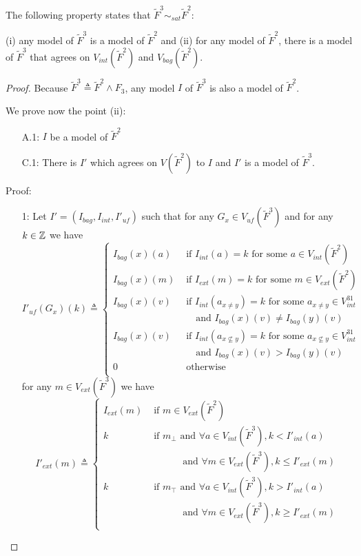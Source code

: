 The following property states that $\tilde{F}^3 \sim_{sat} \tilde{F}^2$:
\begin{myprop}
\label{prop:countabs}
(i) any model of $\tilde{F}^3$ is a model of $\tilde{F}^2$ and
(ii) for any model of $\tilde{F}^2$, there is a model of $\tilde{F}^3$ that agrees on $V_{int}(\tilde{F}^2)$ and $V_{bag}(\tilde{F}^2)$.
\end{myprop}

\begin{proof}

Because $\tilde{F}^3 \triangleq \tilde{F}^2 \land F_{3}$, any model $I$ of $\tilde{F}^3$ is also a model of $\tilde{F}^2$.

We prove now the point (ii):
\begin{enumerate}
\item[A.1:] $I$ be a model of $\tilde{F}^2$
\item[C.1:] There is $I'$ which agrees on $V(\tilde{F}^2)$ to $I$ and $I'$ is a model of $\tilde{F}^3$.
\end{enumerate}
Proof:
\begin{enumerate}
\item[1:] Let $I'=(I_{bag}, I_{int},I'_{\textit{uf}})$ such that for any $G_{x}\in V_{\textit{uf}}(\tilde{F}^3)$ and for any $k \in \mathbb{Z}$ we have
$$
I'_{\textit{uf}}(G_{x})(k) \triangleq \left\{
\begin{array}{ll}
I_{bag}(x)(a) & \mbox{ if }  I_{int}(a) = k \mbox{ for some } a \in V_{int}(\tilde{F}^2) \\
I_{bag}(x)(m) & \mbox{ if }  I_{ext}(m) = k \mbox{ for some } m \in V_{ext}(\tilde{F}^2) \\
I_{bag}(x)(v) & \mbox{ if }  I_{int}(a_{x\neq y}) = k \mbox{ for some }a_{x\neq y} \in V^{31}_{int} \\
& \quad \mbox{ and } I_{bag}(x)(v) \neq I_{bag}(y)(v)\\
I_{bag}(x)(v) & \mbox{ if }  I_{int}(a_{x\nsubseteq y}) = k \mbox{ for some }a_{x\nsubseteq y} \in V^{31}_{int} \\
& \quad \mbox{ and } I_{bag}(x)(v) > I_{bag}(y)(v)\\
0 & \mbox{ otherwise}\\
\end{array}\right.
$$
for any $m\in V_{ext}(\tilde{F}^3)$ we have
$$
I'_{ext}(m) \triangleq \left\{
\begin{array}{ll}
I_{ext}(m) & \mbox{ if } m \in V_{ext}(\tilde{F}^2) \\
k & \mbox{ if } m_{\bot} \mbox{ and } \forall a \in V_{int}(\tilde{F}^3), k<I'_{int}(a) \\
& \quad\quad\quad\mbox{ and } \forall m \in V_{ext}(\tilde{F}^3), k\leq I'_{ext}(m)\\
k & \mbox{ if } m_{\top} \mbox{ and } \forall a \in V_{int}(\tilde{F}^3), k>I'_{int}(a) \\
& \quad\quad\quad\mbox{ and } \forall m \in V_{ext}(\tilde{F}^3), k\geq I'_{ext}(m)\\
\end{array}\right.
$$


\end{enumerate}
\end{proof}
